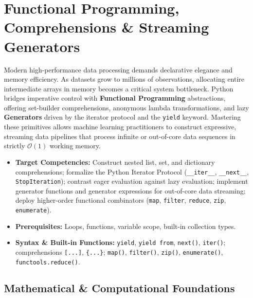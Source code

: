 \chapter{Functional Programming, Comprehensions \& Streaming Generators}

Modern high-performance data processing demands declarative elegance and memory efficiency. As datasets grow to millions of observations, allocating entire intermediate arrays in memory becomes a critical system bottleneck. Python bridges imperative control with \textbf{Functional Programming} abstractions, offering set-builder comprehensions, anonymous lambda transformations, and lazy \textbf{Generators} driven by the iterator protocol and the \texttt{yield} keyword. Mastering these primitives allows machine learning practitioners to construct expressive, streaming data pipelines that process infinite or out-of-core data sequences in strictly $\mathcal{O}(1)$ working memory.

\vspace{0.5cm}
\begin{tcolorbox}[colback=primarylight, colframe=primarydark, title={\textbf{Executive Roadmap \& Learning Objectives}}]
\begin{itemize}
    \item \textbf{Target Competencies:} Construct nested list, set, and dictionary comprehensions; formalize the Python Iterator Protocol (\texttt{\_\_iter\_\_}, \texttt{\_\_next\_\_}, \texttt{StopIteration}); contrast eager evaluation against lazy evaluation; implement generator functions and generator expressions for out-of-core data streaming; deploy higher-order functional combinators (\texttt{map}, \texttt{filter}, \texttt{reduce}, \texttt{zip}, \texttt{enumerate}).
    \item \textbf{Prerequisites:} Loops, functions, variable scope, built-in collection types.
    \item \textbf{Syntax \& Built-in Functions:} \texttt{yield}, \texttt{yield from}, \texttt{next()}, \texttt{iter()}; comprehensions \texttt{[...]}, \texttt{\{...\}}; \texttt{map()}, \texttt{filter()}, \texttt{zip()}, \texttt{enumerate()}, \texttt{functools.reduce()}.
\end{itemize}
\end{tcolorbox}

\section{Mathematical \& Computational Foundations}


